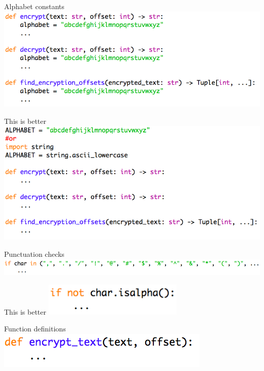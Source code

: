 \documentclass[week2]{csse1001}
\begin{document}
\begin{topic}{Alphabet constants}
\includegraphics[width=\textwidth]{a1pitfalls/alphabad}
\end{topic}

\begin{topic}{This is better}
\includegraphics[width=\textwidth]{a1pitfalls/alphagood}
\end{topic}

\begin{topic}{Punctuation checks}
\includegraphics[width=\textwidth]{a1pitfalls/punctubad}
\end{topic}

\begin{topic}{This is better}
\includegraphics[width=0.5\textwidth]{a1pitfalls/punctugood}
\end{topic}

\begin{topic}{Function definitions}
\includegraphics[width=\textwidth]{a1pitfalls/fdef}
\end{topic}
\end{document}
